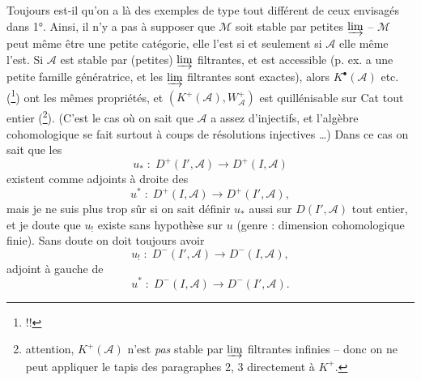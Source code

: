 Toujours est-il qu'on a là des exemples de type tout différent de ceux envisagés dans 1°. Ainsi, il n'y a pas à supposer que $\mathcal{M}$ soit stable par petites $\varinjlim$ -- $\mathcal{M}$ peut même être une petite catégorie, elle l'est si et seulement si $\mathcal{A}$ elle même l'est. Si $\mathcal{A}$ est stable par (petites) $\varinjlim$ filtrantes, et est accessible (p. ex. a une petite famille génératrice, et les $\varinjlim$ filtrantes sont exactes), alors $K^{\bullet}(\mathcal{A})$ etc. (\footnote[30]{!!}) ont les mêmes propriétés, et $(K^{+}(\mathcal{A}),W_{\mathcal{A}}^{+})$ est quillénisable sur Cat tout entier (\footnote[31]{attention, $K^{+}(\mathcal{A})$ n'est \textit{pas} stable par $\varinjlim$ filtrantes infinies -- donc on ne peut appliquer le tapis des paragraphes 2, 3 directement à $K^{+}$.}). (C'est le cas où on sait que $\mathcal{A}$ a assez d'injectifs, et l'algèbre cohomologique se fait surtout à coups de résolutions injectives \dots) Dans ce cas on sait que les %
\[ u_{*} \;:\; D^{+}(I',\mathcal{A}) \longrightarrow D^{+}(I,\mathcal{A}) \]
existent comme adjoints à droite des
\[ u^{*} \;:\; D^{+}(I,\mathcal{A}) \longrightarrow D^{+}(I',\mathcal{A}), \]
mais je ne suis plus trop sûr si on sait définir $u_{*}$ aussi sur $D(I',\mathcal{A})$ tout entier, et je doute que $u_{!}$ existe sans hypothèse sur $u$ (genre : dimension cohomologique finie). Sans doute on doit toujours avoir
\[ u_{!} \;:\; D^{-}(I',\mathcal{A}) \longrightarrow D^{-}(I,\mathcal{A}), \]
adjoint à gauche de
\[ u^{*} \;:\; D^{-}(I,\mathcal{A}) \longrightarrow D^{-}(I',\mathcal{A}). \]

